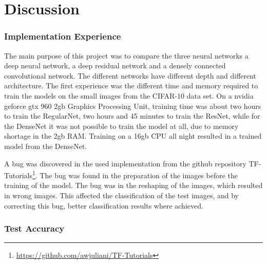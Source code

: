 \chapter{Discussion}
\label{chp:discussion}

\subsection{Implementation Experience}

The main purpose of this project was to compare the three neural networks a deep neural network, a deep residual network and a densely connected convolutional network. The different networks have different depth and different architecture. The first experience was the different time and memory required to train the models on the small images from the CIFAR-10 data set. On a nvidia geforce gtx 960 2gb Graphics Processing Unit, training time was about two hours to train the RegularNet, two hours and 45 minutes to train the ResNet, while for the DenseNet it was not possible to train the model at all, due to memory shortage in the 2gb RAM. Training on a 16gb CPU all night resulted in a trained model from the DenseNet.

A bug was discovered in the used implementation from the github repository TF-Tutorials\footnote{\url{https://github.com/awjuliani/TF-Tutorials}}. The bug was found in the preparation of the images before the training of the model. The bug was in the reshaping of the images, which resulted in wrong images. This affected the classification of the test images, and by correcting this bug, better classification results where achieved.

\subsection{Test Accuracy}

\FloatBarrier


